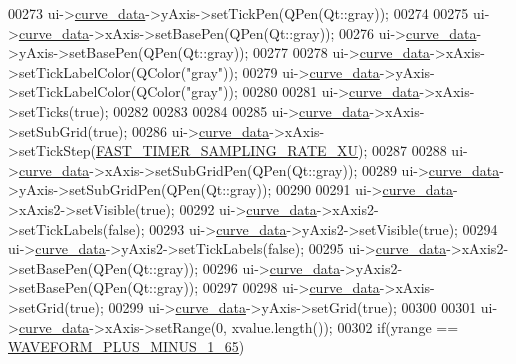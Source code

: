 \begin{DoxyCode}
00273     ui->\hyperlink{a00081_a247d94481323c0bc4f8b6458a8a535dd}{curve\_data}->yAxis->setTickPen(QPen(Qt::gray));
00274 
00275     ui->\hyperlink{a00081_a247d94481323c0bc4f8b6458a8a535dd}{curve\_data}->xAxis->setBasePen(QPen(Qt::gray));
00276     ui->\hyperlink{a00081_a247d94481323c0bc4f8b6458a8a535dd}{curve\_data}->yAxis->setBasePen(QPen(Qt::gray));
00277 
00278     ui->\hyperlink{a00081_a247d94481323c0bc4f8b6458a8a535dd}{curve\_data}->xAxis->setTickLabelColor(QColor(\textcolor{stringliteral}{"gray"}));
00279     ui->\hyperlink{a00081_a247d94481323c0bc4f8b6458a8a535dd}{curve\_data}->yAxis->setTickLabelColor(QColor(\textcolor{stringliteral}{"gray"}));
00280 
00281     ui->\hyperlink{a00081_a247d94481323c0bc4f8b6458a8a535dd}{curve\_data}->xAxis->setTicks(\textcolor{keyword}{true});
00282 
00283 
00284 
00285     ui->\hyperlink{a00081_a247d94481323c0bc4f8b6458a8a535dd}{curve\_data}->xAxis->setSubGrid(\textcolor{keyword}{true});
00286     ui->\hyperlink{a00081_a247d94481323c0bc4f8b6458a8a535dd}{curve\_data}->xAxis->setTickStep(\hyperlink{a00086_a87ea9a0eaa474d8b8f672cfa5cbb091f}{FAST\_TIMER\_SAMPLING\_RATE\_XU});
00287 
00288     ui->\hyperlink{a00081_a247d94481323c0bc4f8b6458a8a535dd}{curve\_data}->xAxis->setSubGridPen(QPen(Qt::gray));
00289     ui->\hyperlink{a00081_a247d94481323c0bc4f8b6458a8a535dd}{curve\_data}->yAxis->setSubGridPen(QPen(Qt::gray));
00290 
00291     ui->\hyperlink{a00081_a247d94481323c0bc4f8b6458a8a535dd}{curve\_data}->xAxis2->setVisible(\textcolor{keyword}{true});
00292     ui->\hyperlink{a00081_a247d94481323c0bc4f8b6458a8a535dd}{curve\_data}->xAxis2->setTickLabels(\textcolor{keyword}{false});
00293     ui->\hyperlink{a00081_a247d94481323c0bc4f8b6458a8a535dd}{curve\_data}->yAxis2->setVisible(\textcolor{keyword}{true});
00294     ui->\hyperlink{a00081_a247d94481323c0bc4f8b6458a8a535dd}{curve\_data}->yAxis2->setTickLabels(\textcolor{keyword}{false});
00295     ui->\hyperlink{a00081_a247d94481323c0bc4f8b6458a8a535dd}{curve\_data}->xAxis2->setBasePen(QPen(Qt::gray));
00296     ui->\hyperlink{a00081_a247d94481323c0bc4f8b6458a8a535dd}{curve\_data}->yAxis2->setBasePen(QPen(Qt::gray));
00297 
00298      ui->\hyperlink{a00081_a247d94481323c0bc4f8b6458a8a535dd}{curve\_data}->xAxis->setGrid(\textcolor{keyword}{true});
00299      ui->\hyperlink{a00081_a247d94481323c0bc4f8b6458a8a535dd}{curve\_data}->yAxis->setGrid(\textcolor{keyword}{true});
00300 
00301   ui->\hyperlink{a00081_a247d94481323c0bc4f8b6458a8a535dd}{curve\_data}->xAxis->setRange(0, xvalue.length());
00302   \textcolor{keywordflow}{if}(yrange == \hyperlink{a00090_a0923d3b365a36e1e8c401cec964aa36f}{WAVEFORM\_PLUS\_MINUS\_1\_65})

\end{DoxyCode}
